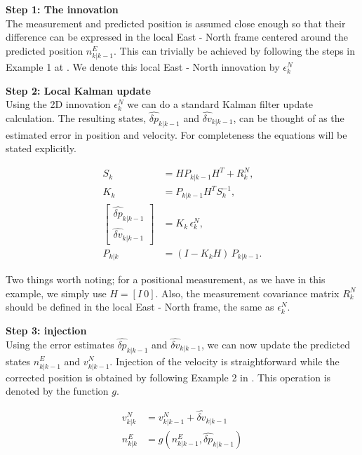 \textbf{Step 1: The innovation} \\
The measurement and predicted position is assumed close enough so that their difference can be expressed in the local East - North frame centered around the predicted position $n^E_{k \vert k-1}$. This can trivially be achieved by following the steps in Example 1 at \parencite{ffi_nvector}. We denote this local East - North innovation by $\epsilon^N_k$

\textbf{Step 2: Local Kalman update} \\
Using the 2D innovation $\epsilon^N_k$ we can do a standard Kalman filter update calculation. The resulting states, $\widehat{\delta p}_{k \vert k-1}$ and $\widehat{\delta v}_{k \vert k-1}$, can be thought of as the estimated error in position and velocity. For completeness the equations will be stated explicitly. 

\begin{align}
S_k &= H P_{k|k-1} H^T + R^N_k, \\[4pt]
K_k &= P_{k|k-1} H^T S_k^{-1}, \\[4pt]
\begin{bmatrix}
\widehat{\delta p}_{k|k-1} \\
\widehat{\delta v}_{k|k-1}
\end{bmatrix}
&= K_k\, \epsilon^N_k, \\[4pt]
P_{k|k} &= (I - K_k H)\, P_{k|k-1}.
\end{align}

Two things worth noting; for a positional measurement, as we have in this example, we simply use $H = [I \: 0]$. Also, the measurement covariance matrix $R^N_k$ should be defined in the local East - North frame, the same as $\epsilon^N_k$.

\textbf{Step 3: injection} \\
Using the error estimates $\widehat{\delta p}_{k \vert k-1}$ and $\widehat{\delta v}_{k \vert k-1}$, we can now update the predicted states $n^E_{k \vert k-1}$ and $v^N_{k \vert k-1}$. Injection of the velocity is straightforward while the corrected position is obtained by following Example 2 in \parencite{ffi_nvector}. This operation is denoted by the function $g$.

\begin{align}
    v^N_{k \vert k} &= v^N_{k \vert k-1} + \widehat{\delta v}_{k \vert k-1} \\
    n^E_{k \vert k} &= g(n^E_{k \vert k-1}, \widehat{\delta p}_{k \vert k-1})
\end{align}

